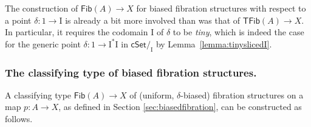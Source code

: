 \documentclass[11pt,reqno]{amsart}
\newcommand{\cSet}{\ensuremath{\mathsf{cSet}}}
\newcommand{\slice}[1]{\ensuremath{/_{\!{#1}}}}
\newcommand{\ra}{\ensuremath{\rightarrow}}
\renewcommand{\to}{\ensuremath{\rightarrow}}
\newcommand{\I}{\ensuremath{\mathrm{I}}}
\newcommand{\Fib}{\ensuremath{\mathsf{Fib}}}
\newcommand{\TFib}{\ensuremath{\mathsf{TFib}}}
\theoremstyle{remark}
\theoremstyle{definition}
\begin{document}
The construction of $\Fib(A)\ra X$ for biased fibration structures with respect to a point $\delta : 1\to \I$ is already a bit more involved than was that of $\TFib(A)\ra X$.  In particular, it requires the codomain $\I$ of $\delta$ to be \emph{tiny}, which is indeed the case for the generic point $\delta : 1 \to  \I^*\I$ in $\cSet\slice{\I}$ by Lemma~\ref{lemma:tinyslicedI}.

\subsubsection*{The classifying type of biased fibration structures.}

A classifying type $\Fib(A)\ra X$ of (uniform, $\delta$-biased) fibration structures on a map $p: A\ra X$, 
as defined in Section \ref{sec:biasedfibration}, can be constructed as follows.
\end{document}
